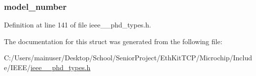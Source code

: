 \hypertarget{struct___system_model_a1a8673ffb1117d2d8848877ba48119b9}{}
\subsubsection[{model\+\_\+number}]{ model\+\_\+number}\label{struct___system_model_a1a8673ffb1117d2d8848877ba48119b9}


Definition at line 141 of file ieee\+\_\+\_\+phd\+\_\+types.\+h.



The documentation for this struct was generated from the following file\+:\begin{DoxyCompactItemize}
\item 
C\+:/\+Users/mainuser/\+Desktop/\+School/\+Senior\+Project/\+Eth\+Kit\+T\+C\+P/\+Microchip/\+Include/\+I\+E\+E\+E/\hyperlink{ieee__11073__phd__types_8h}{ieee\+\_\+\_\+phd\+\_\+types.\+h}\end{DoxyCompactItemize}
